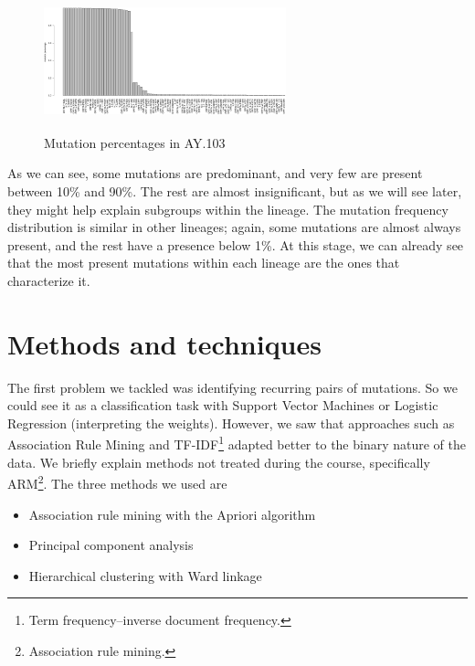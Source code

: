 \documentclass[twoside,twocolumn]{article}
\begin{document}
	\begin{figure}[h]
		\caption{Mutation percentages in AY.103}
		\label{ay103barplot}
		\centering
		\includegraphics[width=70mm, height=40mm]{ay103barplot.png}
	\end{figure}
	As we can see, some mutations are predominant, and very few are present between 10\% and 90\%. The rest are almost insignificant, but as we will see later, they might help explain subgroups within the lineage. The mutation frequency distribution is similar in other lineages; again, some mutations are almost always present, and the rest have a presence below 1\%. At this stage, we can already see that the most present mutations within each lineage are the ones that characterize it.
	
	\section{Methods and techniques}
	
	The first problem we tackled was identifying recurring pairs of mutations. So we could see it as a classification task with Support Vector Machines or Logistic Regression (interpreting the weights). However, we saw that approaches such as Association Rule Mining\cite{armpaper} and TF-IDF\footnote{Term frequency–inverse document frequency.}\cite{tfidf} adapted better to the binary nature of the data.
	We briefly explain methods not treated during the course, specifically ARM\footnote{Association rule mining.}. The three methods we used are
	\begin{itemize}
		\item Association rule mining with the Apriori algorithm
		\item Principal component analysis
		\item Hierarchical clustering with Ward linkage\cite{ward}
	\end{itemize}
\end{document}
